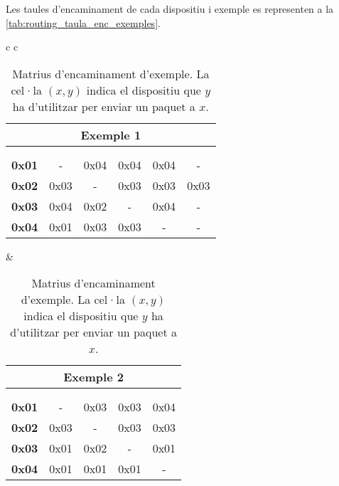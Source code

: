 \documentclass{tfgitic}[2024/07/01]
\begin{document}
{Les taules d'encaminament de cada dispositiu i exemple es representen a la \autoref{tab:routing_taula_enc_exemples}.

\begin{table}[h!]
    \centering
    \begin{tabular}{c c}
        \begin{tabular}{r|ccccc}
            \multicolumn{6}{c}{\small Exemple 1} \\
            \hline
            \multicolumn{1}{c|}{\vcell{}} & \vcell{\textbf{0x01}} & \vcell{\textbf{0x02}} & \vcell{\textbf{0x03}} & \vcell{\textbf{0x04}} & \vcell{\textbf{0x05}} \\[-\rowheight]
            \multicolumn{1}{c|}{\printcellmiddle} & \printcellbottom & \printcellbottom & \printcellbottom & \printcellbottom & \printcellbottom \\ 
            \hline
            \textbf{0x01} & - & 0x04 & 0x04 & 0x04 & - \\
            \textbf{0x02} & 0x03 & - & 0x03 & 0x03 & 0x03 \\
            \textbf{0x03} & 0x04 & 0x02 & - & 0x04 & - \\
            \textbf{0x04} & 0x01 & 0x03 & 0x03 & - & -
        \end{tabular}
        &
        \begin{tabular}{r|cccc}
            \multicolumn{5}{c}{\small Exemple 2} \\
            \hline
            \multicolumn{1}{c|}{\vcell{}} & \vcell{\textbf{0x01}} & \vcell{\textbf{0x02}} & \vcell{\textbf{0x03}} & \vcell{\textbf{0x04}} \\
            [-\rowheight]
            \multicolumn{1}{c|}{\printcellmiddle} & \printcellbottom & \printcellbottom & \printcellbottom & \printcellbottom  \\ 
            \hline
            \textbf{0x01} & -    & 0x03 & 0x03 & 0x04 \\
            \textbf{0x02} & 0x03 & -    & 0x03 & 0x03 \\
            \textbf{0x03} & 0x01 & 0x02 & -    & 0x01 \\
            \textbf{0x04} & 0x01 & 0x01 & 0x01 & -
        \end{tabular}
    \end{tabular}
    \caption{Matrius d'encaminament d'exemple. La cel·la $(x, y)$ indica el dispositiu que $y$ ha d'utilitzar per enviar un paquet a $x$.}
    \label{tab:routing_taula_enc_exemples}
\end{table}


}
\end{document}
